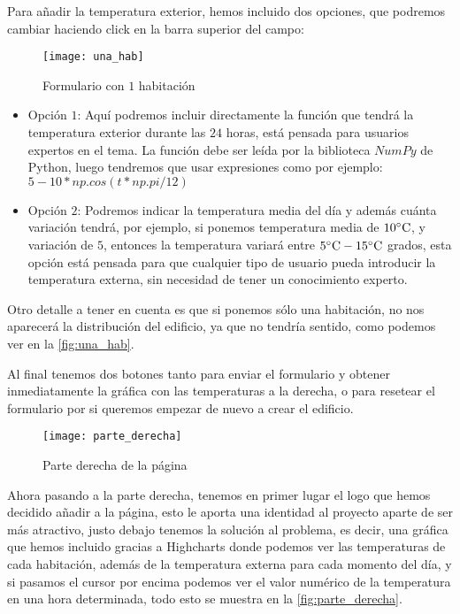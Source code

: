Para añadir la temperatura exterior, hemos incluido dos opciones, que podremos cambiar haciendo click en la barra superior del campo:
\begin{figure}[h!]
	\centering
	\texttt{[image: una\_hab]}
	\caption{Formulario con $1$ habitación}
	\label{fig:una_hab}
\end{figure}
\begin{itemize}
	\item Opción $1$: Aquí podremos incluir directamente la función que tendrá la temperatura exterior durante las $24$ horas, está pensada para usuarios expertos en el tema. La función debe ser leída por la biblioteca $NumPy$ de Python, luego tendremos que usar expresiones como por ejemplo: $5 - 10*np.cos(t*np.pi/12)$
	\item Opción $2$: Podremos indicar la temperatura media del día y además cuánta variación tendrá, por ejemplo, si ponemos temperatura media de $10 \celsius$, y variación de $5$, entonces la temperatura variará entre $5 \celsius -15 \celsius$ grados, esta opción está pensada para que cualquier tipo de usuario pueda introducir la temperatura externa, sin necesidad de tener un conocimiento experto.
\end{itemize}

Otro detalle a tener en cuenta es que si ponemos sólo una habitación, no nos aparecerá la distribución del edificio, ya que no tendría sentido, como podemos ver en la \autoref{fig:una_hab}.

Al final tenemos dos botones tanto para enviar el formulario y obtener inmediatamente la gráfica con las temperaturas a la derecha, o para resetear el formulario por si queremos empezar de nuevo a crear el edificio.
\begin{figure}[h!]
	\centering
	\texttt{[image: parte\_derecha]}
	\caption{Parte derecha de la página}
	\label{fig:parte_derecha}
\end{figure}

Ahora pasando a la parte derecha, tenemos en primer lugar el logo que hemos decidido añadir a la página, esto le aporta una identidad al proyecto aparte de ser más atractivo, justo debajo tenemos la solución al problema, es decir, una gráfica que hemos incluido gracias a Highcharts donde podemos ver las temperaturas de cada habitación, además de la temperatura externa para cada momento del día, y si pasamos el cursor por encima podemos ver el valor numérico de la temperatura en una hora determinada, todo esto se muestra en la \autoref{fig:parte_derecha}.

